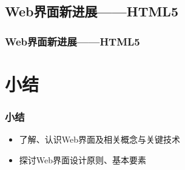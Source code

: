 \documentclass{beamer}
\begin{document}
\subsection{Web界面新进展——HTML5}
\begin{frame}
	\frametitle{Web界面新进展——HTML5}

\end{frame}

\section{小结}
\begin{frame}
	\frametitle{小结}
	\begin{itemize}
		\item 了解、认识Web界面及相关概念与关键技术
		\item 探讨Web界面设计原则、基本要素
	\end{itemize}
\end{frame}
\end{document}
